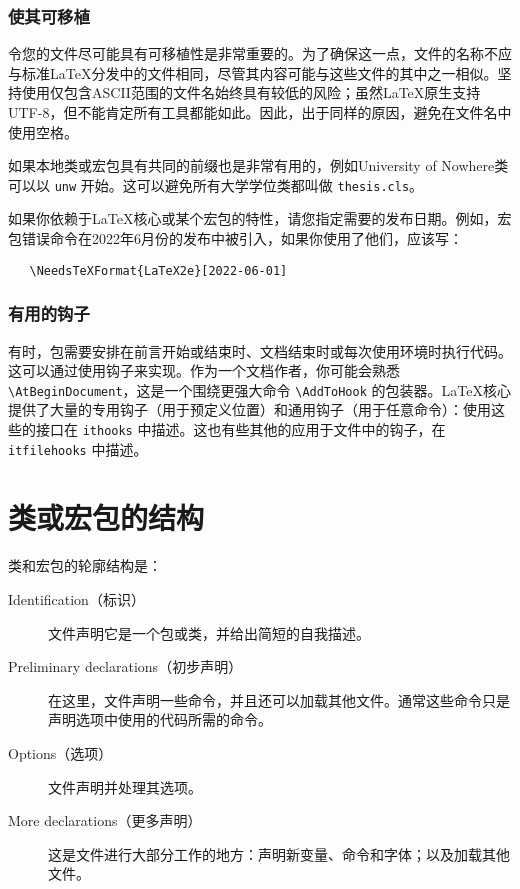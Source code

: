 \documentclass[12pt]{ltxguide}
\begin{document}
\subsubsection{使其可移植}
令您的文件尽可能具有可移植性是非常重要的。为了确保这一点，文件的名称不应与标准\LaTeX{}分发中的文件相同，尽管其内容可能与这些文件的其中之一相似。坚持使用仅包含ASCII范围的文件名始终具有较低的风险；虽然\LaTeX{}原生支持UTF-8，但不能肯定所有工具都能如此。因此，出于同样的原因，避免在文件名中使用空格。

如果本地类或宏包具有共同的前缀也是非常有用的，例如University of Nowhere类可以以 \verb|unw| 开始。这可以避免所有大学学位类都叫做 \verb|thesis.cls|。

如果你依赖于\LaTeX{}核心或某个宏包的特性，请您指定需要的发布日期。例如，宏包错误命令在2022年6月份的发布中被引入，如果你使用了他们，应该写：
\begin{verbatim}
   \NeedsTeXFormat{LaTeX2e}[2022-06-01]
\end{verbatim}
%
\subsubsection{有用的钩子}
有时，包需要安排在前言开始或结束时、文档结束时或每次使用环境时执行代码。这可以通过使用钩子来实现。作为一个文档作者，你可能会熟悉 \verb|\AtBeginDocument|，这是一个围绕更强大命令 \verb|\AddToHook| 的包装器。\LaTeX{}核心提供了大量的专用钩子（用于预定义位置）和通用钩子（用于任意命令）：使用这些的接口在 \texttt{ithooks} 中描述。这也有些其他的应用于文件中的钩子，在 \texttt{itfilehooks} 中描述。

\section{类或宏包的结构}
类和宏包的轮廓结构是：
\begin{description}
\item[Identification（标识）] 文件声明它是一个\LaTeXe{}包或类，并给出简短的自我描述。
\item[Preliminary declarations（初步声明）] 在这里，文件声明一些命令，并且还可以加载其他文件。通常这些命令只是声明选项中使用的代码所需的命令。
\item[Options（选项）] 文件声明并处理其选项。
\item[More declarations（更多声明）] 这是文件进行大部分工作的地方：声明新变量、命令和字体；以及加载其他文件。
\end{description}
\end{document}
